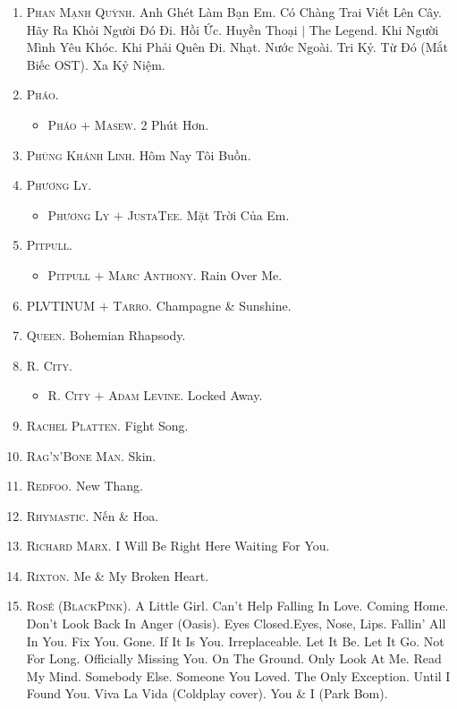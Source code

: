 \documentclass{article}
\begin{document}
\begin{enumerate}
	\item \textsc{Phan Mạnh Quỳnh.} Anh Ghét Làm Bạn Em. Có Chàng Trai Viết Lên Cây. Hãy Ra Khỏi Người Đó Đi. Hồi Ức. Huyền Thoại $|$ The Legend. Khi Người Mình Yêu Khóc. Khi Phải Quên Đi. Nhạt. Nước Ngoài. Tri Kỷ. Từ Đó (Mắt Biếc OST). Xa Kỷ Niệm.
	\item \textsc{Pháo.}
	\begin{itemize}
		\item \textsc{Pháo $+$ Masew.} 2 Phút Hơn.
	\end{itemize}
	\item \textsc{Phùng Khánh Linh.} Hôm Nay Tôi Buồn.
	\item \textsc{Phương Ly.}
	\begin{itemize}
		\item \textsc{Phương Ly $+$ JustaTee.} Mặt Trời Của Em.
	\end{itemize}
	\item \textsc{Pitpull.}
	\begin{itemize}
		\item \textsc{Pitpull $+$ Marc Anthony.} Rain Over Me.
	\end{itemize}
	\item \textsc{PLVTINUM $+$ Tarro.} Champagne \& Sunshine.
	\item \textsc{Queen.} Bohemian Rhapsody.
	\item \textsc{R. City.}
	\begin{itemize}
		\item \textsc{R. City $+$ Adam Levine.} Locked Away.
	\end{itemize}
	\item \textsc{Rachel Platten.} Fight Song.
	\item \textsc{Rag'n'Bone Man.} Skin.
	\item \textsc{Redfoo.} New Thang.
	\item \textsc{Rhymastic.} Nến \& Hoa.
	\item \textsc{Richard Marx.} I Will Be Right Here Waiting For You.
	\item \textsc{Rixton.} Me \& My Broken Heart.
	\item \textsc{Ros\'e (BlackPink).} A Little Girl. Can't Help Falling In Love. Coming Home. Don't Look Back In Anger (Oasis). Eyes Closed.Eyes, Nose, Lips. Fallin' All In You. Fix You. Gone. If It Is You. Irreplaceable. Let It Be. Let It Go. Not For Long. Officially Missing You. On The Ground. Only Look At Me. Read My Mind. Somebody Else. Someone You Loved. The Only Exception. Until I Found You. Viva La Vida (Coldplay cover). You \& I (Park Bom).

\end{enumerate}
\end{document}

